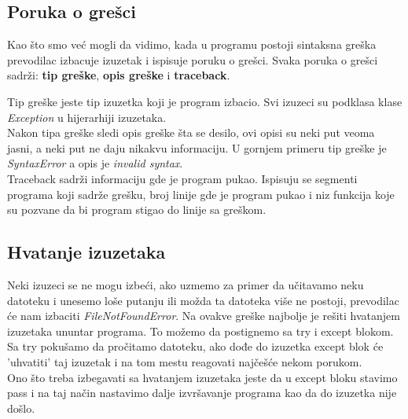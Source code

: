 \documentclass[a4paper]{article}
\begin{document}
\subsection{Poruka o grešci}
Kao što smo već mogli da vidimo, kada u programu postoji sintaksna greška prevodilac izbacuje izuzetak i ispisuje poruku o grešci. Svaka poruka o grešci sadrži: \textbf{tip greške}, \textbf{opis greške} i \textbf{traceback}.

Tip greške jeste tip izuzetka koji je program izbacio. Svi izuzeci su podklasa klase \emph{Exception} u hijerarhiji izuzetaka.\\
Nakon tipa greške sledi opis greške šta se desilo, ovi opisi su neki put veoma jasni, a neki put ne daju nikakvu informaciju. U gornjem primeru tip greške je \emph{SyntaxError} a opis je \emph{invalid syntax}.\\
Traceback sadrži informaciju gde je program pukao. Ispisuju se segmenti programa koji sadrže grešku, broj linije gde je program pukao i niz funkcija koje su pozvane da bi program stigao do linije sa greškom.
\subsection{Hvatanje izuzetaka}
Neki izuzeci se ne mogu izbeći, ako uzmemo za primer da učitavamo neku datoteku i unesemo loše putanju ili možda ta datoteka više ne postoji, prevodilac će nam izbaciti \emph{FileNotFoundError}. Na ovakve greške najbolje je rešiti hvatanjem izuzetaka ununtar programa. To možemo da postignemo sa try i except blokom. Sa try pokušamo da pročitamo datoteku, ako dođe do izuzetka except blok će 'uhvatiti' taj izuzetak i na tom mestu reagovati najčešće nekom porukom.\\
Ono što treba izbegavati sa hvatanjem izuzetaka jeste da u except bloku stavimo pass i na taj način nastavimo dalje izvršavanje programa kao da do izuzetka nije došlo.
\end{document}
